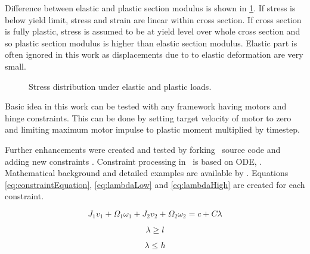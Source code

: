 Difference between elastic and plastic section modulus is shown in \ref{fig:wp}. 
If stress is below yield limit, stress and strain are linear within cross section.
If cross section is fully plastic, stress is assumed to be at yield level over whole cross section and 
so plastic section modulus is higher than elastic section modulus.
Elastic part is often ignored in this work as displacements due to to elastic deformation are very small.

\begin{figure}[htb!]
\centering
{}
\hspace{1cm}
\caption{Stress distribution under elastic and plastic loads.}
\label{fig:wp}
\end{figure}

Basic idea in this work can be tested with any framework having motors and hinge constraints.
This can be done by setting target velocity of motor to zero and limiting maximum motor impulse to plastic moment 
multiplied by timestep.

Further enhancements were created and tested by forking \bullet\ source code
and adding new constraints \cite{pbullet}.
Constraint processing in \bullet\ is based on ODE, \cite{ode}.
Mathematical background and detailed examples are available by \cite{ode.joints}.
Equations \ref{eq:constraintEquation}, \ref{eq:lambdaLow} and
\ref{eq:lambdaHigh} 
are created for each constraint.

\begin{equation} \label{eq:constraintEquation}
J_1 v_1 + \Omega_1 \omega_1 + J_2 v_2 + \Omega_2 \omega_2 = c + C \lambda
\end{equation}

\begin{equation} \label{eq:lambdaLow}
\lambda \geq l
\end{equation}

\begin{equation} \label{eq:lambdaHigh}
\lambda \leq h
\end{equation}

